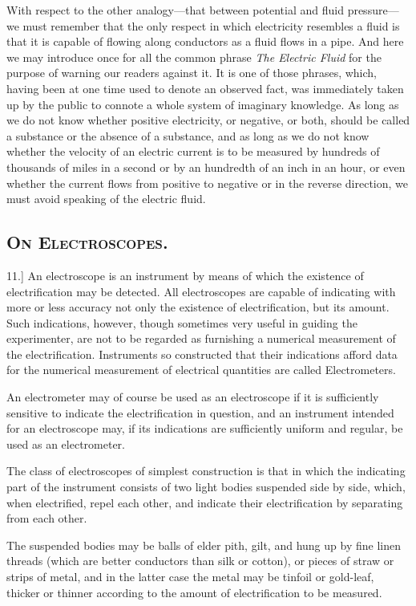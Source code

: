 \documentclass[12pt,oneside]{book}[2021/10/04]
\newcommand{\Heading}{\centering\normalfont}
\newcommand{\Section}[1]{\subsection*{\normalsize\Heading\scshape #1}}
\newcommand{\Runhead}[1]{\fancyhead[C]{\iffloatpage{}{\small#1}}}
\newcommand{\article}[1]{\phantomsection \label{art:#1}{#1.]}}
\newcommand{\¬}{\hphantom{0}}
\begin{document}
With respect to the other analogy---that between potential and
fluid pressure---we must remember that the only respect in which
electricity resembles a fluid is that it is capable of flowing along
conductors as a fluid flows in a pipe. And here we may introduce
once for all the common phrase \textit{The Electric Fluid} for the purpose
of warning our readers against it. It is one of those phrases,
which, having been at one time used to denote an observed fact,
was immediately taken up by the public to connote a whole system
of imaginary knowledge. As long as we do not know whether
positive electricity, or negative, or both, should be called a substance
or the absence of a substance, and as long as we do not
know whether the velocity of an electric current is to be measured
by hundreds of thousands of miles in a second or by an hundredth of
an inch in an hour, or even whether the current flows from positive
to negative or in the reverse direction, we must avoid speaking of
the electric fluid.
\Runhead{POTENTIAL, PRESSURE, AND TEMPERATURE.}

\Section{On Electroscopes.}

\article{11} An electroscope is an instrument by means of which the
existence of electrification may be detected. All electroscopes are
capable of indicating with more or less accuracy not only the
existence of electrification, but its amount. Such indications, however,
though sometimes very useful in guiding the experimenter,
are not to be regarded as furnishing a numerical measurement of
the electrification. Instruments so constructed that their indications
afford data for the numerical measurement of electrical
quantities are called Electrometers.

An electrometer may of course be used as an electroscope if it is
sufficiently sensitive to indicate the electrification in question, and
an instrument intended for an electroscope may, if its indications
are sufficiently uniform and regular, be used as an electrometer.

The class of electroscopes of simplest construction is that in
which the indicating part of the instrument consists of two light
bodies suspended side by side, which, when electrified, repel each
other, and indicate their electrification by separating from each
other.

The suspended bodies may be balls of elder pith, gilt, and hung
up by fine linen threads (which are better conductors than silk or
cotton), or pieces of straw or strips of metal, and in the latter case
the metal may be tinfoil or gold-leaf, thicker or thinner according
to the amount of electrification to be measured.
\end{document}
